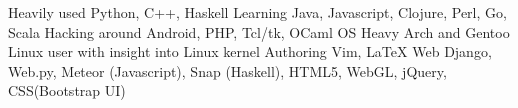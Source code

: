 \begin{cvskills}
  \cvskill
    {Heavily used}
    {Python, C++, Haskell}
      \cvskill
    {Learning}
        {Java, Javascript, Clojure, Perl, Go, Scala}
              \cvskill
    {Hacking around}
        { Android, PHP, Tcl/tk, OCaml}
              \cvskill
    {OS}
        {Heavy Arch and Gentoo Linux user with insight into Linux kernel}
              \cvskill
    {Authoring}
        {Vim, {\LaTeX}}
  \cvskill
    {Web}
    {Django, Web.py, Meteor (Javascript), Snap (Haskell), HTML5, WebGL, jQuery, CSS(Bootstrap UI)}

\end{cvskills}

